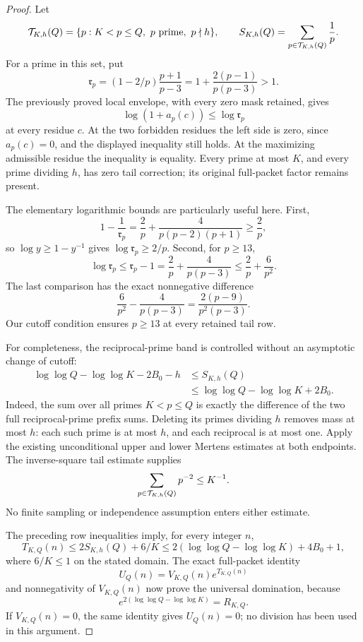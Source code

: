 \documentclass[11pt]{article}
\begin{document}
\begin{proof}
Let
\[
 {\cal T}_{K,h}(Q)=
   \{p:K<p\leq Q,\ p\ {\rm prime},\ p\nmid h\},\qquad
 S_{K,h}(Q)=\sum_{p\in{\cal T}_{K,h}(Q)}\frac1p.
\]
For a prime in this set, put
\[
       \mathfrak r_p=(1-2/p)\frac{p+1}{p-3}
                    =1+\frac{2(p-1)}{p(p-3)}>1.
\]
The previously proved local envelope, with every zero mask retained,
gives
\[
             \log(1+a_p(c))\leq\log\mathfrak r_p
\]
at every residue \(c\). At the two forbidden residues the left side
is zero, since \(a_p(c)=0\), and the displayed inequality still holds.
At the maximizing admissible residue the inequality is equality.
Every prime at most \(K\), and every prime dividing \(h\), has zero
tail correction; its original full-packet factor remains present.

The elementary logarithmic bounds are particularly useful here.
First,
\[
 1-\frac1{\mathfrak r_p}
       =\frac2p+\frac4{p(p-2)(p+1)}\geq\frac2p,
\]
so \(\log y\geq1-y^{-1}\) gives
\(\log\mathfrak r_p\geq2/p\).
Second, for \(p\geq13\),
\[
 \log\mathfrak r_p
   \leq\mathfrak r_p-1
   =\frac2p+\frac4{p(p-3)}
   \leq\frac2p+\frac6{p^2}.
\]
The last comparison has the exact nonnegative difference
\[
          \frac6{p^2}-\frac4{p(p-3)}
                     =\frac{2(p-9)}{p^2(p-3)}.
\]
Our cutoff condition ensures \(p\geq13\) at every retained tail row.

For completeness, the reciprocal-prime band is controlled without
an asymptotic change of cutoff:
\[
 \begin{split}
 \log\log Q-\log\log K-2B_0-h
       &\leq S_{K,h}(Q)\\
       &\leq\log\log Q-\log\log K+2B_0.
 \end{split}
\]
Indeed, the sum over all primes \(K<p\leq Q\) is exactly the
difference of the two full reciprocal-prime prefix sums.
Deleting its primes dividing \(h\) removes mass at most \(h\):
each such prime is at most \(h\), and each reciprocal is at most one.
Apply the existing unconditional upper and lower Mertens estimates
at both endpoints. The inverse-square tail estimate supplies
\[
                    \sum_{p\in{\cal T}_{K,h}(Q)}p^{-2}\leq K^{-1}.
\]
No finite sampling or independence assumption enters either estimate.

The preceding row inequalities imply, for every integer \(n\),
\[
 T_{K,Q}(n)
  \leq 2S_{K,h}(Q)+6/K
  \leq2(\log\log Q-\log\log K)+4B_0+1,
\]
where \(6/K\leq1\) on the stated domain.
The exact full-packet identity
\[
                         U_Q(n)=V_{K,Q}(n)e^{T_{K,Q}(n)}
\]
and nonnegativity of \(V_{K,Q}(n)\) now prove the universal domination,
because
\[
          e^{2(\log\log Q-\log\log K)}=R_{K,Q}.
\]
If \(V_{K,Q}(n)=0\), the same identity gives \(U_Q(n)=0\);
no division has been used in this argument.


\end{proof}
\end{document}
